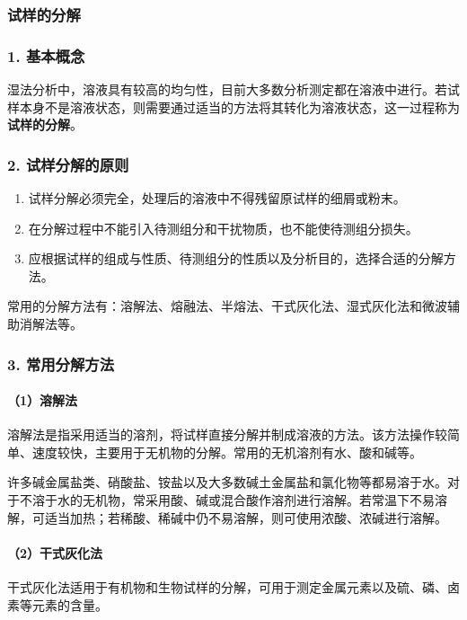 \documentclass[12pt,a4paper]{article}
\numberwithin{equation}{section}
\begin{document}
\subsubsection{试样的分解}
\subsubsection*{1. 基本概念}

湿法分析中，溶液具有较高的均匀性，目前大多数分析测定都在溶液中进行。若试样本身不是溶液状态，则需要通过适当的方法将其转化为溶液状态，这一过程称为\textbf{试样的分解}。

\subsubsection*{2. 试样分解的原则}

\begin{enumerate}
    \item 试样分解必须完全，处理后的溶液中不得残留原试样的细屑或粉末。
    \item 在分解过程中不能引入待测组分和干扰物质，也不能使待测组分损失。
    \item 应根据试样的组成与性质、待测组分的性质以及分析目的，选择合适的分解方法。
\end{enumerate}

\noindent 常用的分解方法有：溶解法、熔融法、半熔法、干式灰化法、湿式灰化法和微波辅助消解法等。

\subsubsection*{3. 常用分解方法}

\paragraph{（1）溶解法}
溶解法是指采用适当的溶剂，将试样直接分解并制成溶液的方法。该方法操作较简单、速度较快，主要用于无机物的分解。常用的无机溶剂有水、酸和碱等。

许多碱金属盐类、硝酸盐、铵盐以及大多数碱土金属盐和氯化物等都易溶于水。对于不溶于水的无机物，常采用酸、碱或混合酸作溶剂进行溶解。若常温下不易溶解，可适当加热；若稀酸、稀碱中仍不易溶解，则可使用浓酸、浓碱进行溶解。

\paragraph{（2）干式灰化法}
干式灰化法适用于有机物和生物试样的分解，可用于测定金属元素以及硫、磷、卤素等元素的含量。
\end{document}
